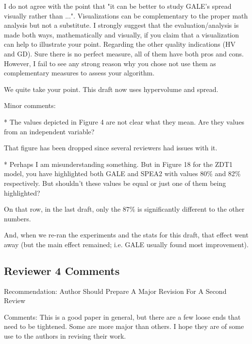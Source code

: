 \documentclass[10pt,journal,compsoc]{IEEEtran}
\newenvironment{changed}{\par}{\par}
\begin{document}
I do not agree with the point that "it can be better
to study GALE's spread visually rather than
...". Visualizations can be complementary to the
proper math analysis but not a substitute. I
strongly suggest that the evaluation/analysis is
made both ways, mathematically and visually, if you
claim that a visualization can help to illustrate
your point.
Regarding the other quality indications (HV and GD). Sure there is no perfect measure, all of them have both pros and cons. However, I fail to see any strong reason why you chose not use them as complementary measures to assess your algorithm.

\begin{changed}
We quite take your point. This draft now uses hypervolume and spread.
\end{changed}

Minor comments:

* The values depicted in Figure 4 are not clear what they mean. Are they values from an independent variable?


\begin{changed}
That figure has been dropped since several reviewers had issues with it.
\end{changed}

* Perhaps I am misunderstanding something. But in Figure 18 for the ZDT1 model, you have highlighted both GALE and SPEA2 with values 80\% and 82\% respectively. But shouldn't these values be equal or just one of them being highlighted?

\begin{changed}
On that row, in the last draft,
only the 87\% is significantly different to the other numbers.

And, when we re-ran the experiments and the stats for this draft, that effect
went away (but the main effect remained; i.e. GALE usually found most improvement).
\end{changed}

\subsection{Reviewer 4 Comments}

Recommendation: Author Should Prepare A Major Revision For A Second Review

Comments:
This is a good paper in general, but there are a few loose ends that need to be tightened. Some are more major than others. I hope they are of some use to the authors in revising their work.
\end{document}
